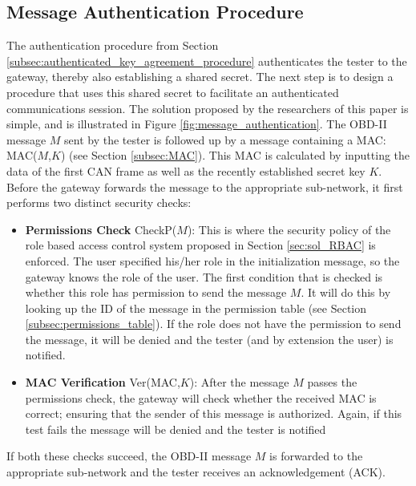 \subsection{Message Authentication Procedure}
\label{subsec:message_authentication_procedure}

The authentication procedure from Section \ref{subsec:authenticated_key_agreement_procedure} authenticates the tester to the gateway, thereby also establishing a shared secret. The next step is to design a procedure that uses this shared secret to facilitate an authenticated communications session. The solution proposed by the researchers of this paper is simple, and is illustrated in Figure \ref{fig:message_authentication}. The OBD-II message $M$ sent by the tester is followed up by a message containing a MAC: MAC($M$,$K$) (see Section \ref{subsec:MAC}). This MAC is calculated by inputting the data of the first CAN frame as well as the recently established secret key $K$. Before the gateway forwards the message to the appropriate sub-network, it first performs two distinct security checks: 
\begin{itemize}
	\item \textbf{Permissions Check} CheckP($M$): This is where the security policy of the role based access control system proposed in Section \ref{sec:sol_RBAC} is enforced. The user specified his/her role in the initialization message, so the gateway knows the role of the user. The first condition that is checked is whether this role has permission to send the message $M$. It will do this by looking up the ID of the message in the permission table (see Section \ref{subsec:permissions_table}). If the role does not have the permission to send the message, it will be denied and the tester (and by extension the user) is notified.
	
	\item \textbf{MAC Verification} Ver(MAC,$K$): After the message $M$ passes the permissions check, the gateway will check whether the received MAC is correct; ensuring that the sender of this message is authorized. Again, if this test fails the message will be denied and the tester is notified
\end{itemize}
If both these checks succeed, the OBD-II message $M$ is forwarded to the appropriate sub-network and the tester receives an acknowledgement (ACK). 

